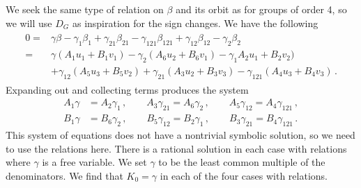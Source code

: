 We seek the same type of relation on $\beta$ and its orbit as for groups of order 4, so we will use $D_G$ as inspiration for the sign changes. We have the following
\begin{align}\begin{split}
0=&\gamma\beta-\gamma_{1}\beta_{1}+\gamma_{21}\beta_{21}-\gamma_{121}\beta_{121}+\gamma_{12}\beta_{12}-\gamma_{2}\beta_{2}\\
	=&\gamma (A_1 u_1 + B_1 v_1) - \gamma_{2} (A_6 u_2 + B_6 v_1) - \gamma_{1} A_2 u_1 + B_2 v_2) \\&+  \gamma_{12} (A_5 u_3 + B_5 v_2) + \gamma_{21}(A_3 u_2 + B_3 v_3) - \gamma_{121} (A_4 u_3 + B_4 v_3)\,.
\end{split}\end{align}
Expanding out and collecting terms produces the system
\begin{align}
	 A_1 \gamma&= A_2 \gamma_{1}\,,\quad   \quad A_3 \gamma_{21} = A_6 \gamma_{2}\,,\quad \quad A_5 \gamma_{12} = A_4 \gamma_{121}\,,\\
	 B_1 \gamma &= B_6\gamma_{2}\,,\quad  \quad  B_5 \gamma_{12}= B_2 \gamma_{1}\,,\quad  \quad B_3 \gamma_{21} = B_4 \gamma_{121}\,.
\end{align}
This system of equations does not have a nontrivial symbolic solution, so we need to use the relations here. There is a rational solution in each case with relations where $\gamma$ is a free variable. We set $\gamma$ to be the least common multiple of the denominators. We find that $K_0 = \gamma$ in each of the four cases with relations.

